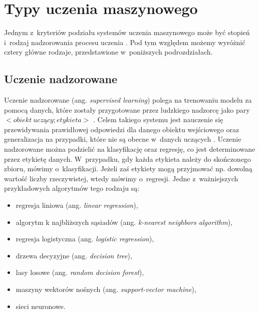 
\section{Typy uczenia maszynowego}
\label{cha:cha3.2}

Jednym z~kryteriów podziału systemów uczenia maszynowego może być stopień i~rodzaj nadzorowania procesu uczenia \cite{Sawka18}. Pod tym względem możemy wyróżnić cztery główne rodzaje, przedstawione w~poniższych podrozdziałach.

\subsection{Uczenie nadzorowane}
\label{cha:cha3.2.1}

Uczenie nadzorowane (ang. \textit{supervised learning}) polega na trenowaniu modelu za pomocą danych, które zostały przygotowane przez ludzkiego nadzorcę jako pary $<obiekt~uczący; etykieta>$ \cite{Sawka20}. Celem takiego systemu jest nauczenie się przewidywania prawidłowej odpowiedzi dla danego obiektu wejściowego oraz generalizacja na przypadki, które nie są obecne w~danych uczących \cite{Sawka20}. 
Uczenie nadzorowane można podzielić na klasyfikację oraz regresję, co jest determinowane przez etykietę danych. W~przypadku, gdy każda etykieta należy do skończonego zbioru, mówimy o~klasyfikacji. Jeżeli zaś etykiety mogą przyjmować np. dowolną wartość liczby rzeczywistej, wtedy mówimy o~regresji. Jedne z~ważniejszych przykładowych algorytmów tego rodzaju są:
\begin{itemize}
\item
regresja liniowa (ang. \textit{linear regression}),

\item
algorytm k najbliższych sąsiadów (ang. \textit{k-nearest neighbors algorithm}),

\item
regresja logistyczna (ang. \textit{logistic regression}),

\item
drzewa decyzyjne (ang. \textit{decision tree}),

\item
lasy losowe (ang. \textit{random decision forest}),

\item
maszyny wektorów nośnych (ang. \textit{support-vector machine}),

\item
sieci neuronowe.
\end{itemize}

